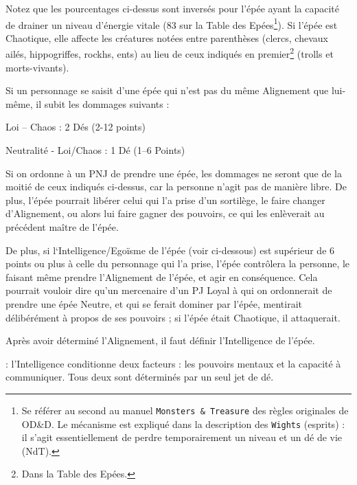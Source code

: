 \documentclass[11pt]{article}
\newcommand{\myunderline}[1]{\underline{\smash{#1}}}
\begin{document}
{{\medskip

Notez que les pourcentages ci-dessus sont inversés pour l'épée ayant la capacité de drainer un niveau d'énergie vitale (83 sur la Table des Epées\footnote
{Se référer au second au manuel \texttt{Monsters \& Treasure} des règles originales de OD\&D. Le mécanisme est expliqué dans la description des \texttt{Wights} (esprits) : il s'agit essentiellement de perdre temporairement un niveau et un dé de vie (NdT).}). Si l'épée est Chaotique, elle affecte les créatures notées entre parenthèses (clercs, chevaux ailés, hippogriffes, rockhs, ents) au lieu de ceux indiqués en premier\footnote{Dans la Table des Epées.} (trolls et morts-vivants).

\medskip

Si un personnage se saisit d'une épée qui n'est pas du même Alignement que lui-même, il subit les dommages suivants :

\medskip

{\parindent2cm Loi -- Chaos : 2 Dés (2-12 points)

Neutralité - Loi/Chaos : 1 Dé (1--6 Points)}

\medskip

Si on ordonne à un PNJ de prendre une épée, les dommages ne seront que de la moitié de ceux indiqués ci-dessus, car la personne n'agit pas de manière libre. De plus, l'épée pourrait libérer celui qui l'a prise d'un sortilège, le faire changer d'Alignement, ou alors lui faire gagner des pouvoirs, ce qui les enlèverait au précédent maître de l'épée.

\medskip

De plus, si l‘Intelligence/Egoïsme de l'épée (voir ci-dessous) est supérieur de 6 points ou plus à celle du personnage qui l'a prise, l'épée contrôlera la personne, le faisant même prendre l'Alignement de l'épée, et agir en conséquence. Cela pourrait vouloir dire qu'un mercenaire d'un PJ Loyal à qui on ordonnerait de prendre une épée Neutre, et qui se ferait dominer par l'épée, mentirait délibérément à propos de ses pouvoirs ; si l'épée était Chaotique, il attaquerait.

\medskip

Après avoir déterminé l'Alignement, il faut définir l'Intelligence de l'épée.

\medskip

\myunderline{Intelligence} : l'Intelligence conditionne deux facteurs : les pouvoirs mentaux et la capacité à communiquer. Tous deux sont déterminés par un seul jet de dé.

}}
\end{document}
